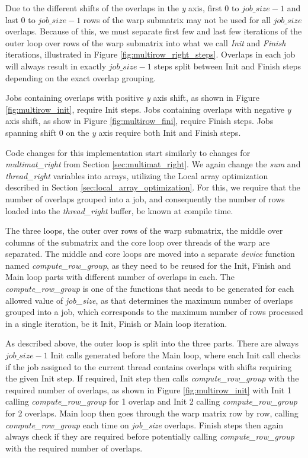 Due to the different shifts of the overlaps in the \textit{y} axis, first $0$ to $job\_size - 1$ and last $0$ to $job\_size - 1$ rows of the warp submatrix may not be used for all $job\_size$ overlaps. Because of this, we must separate first few and last few iterations of the outer loop over rows of the warp submatrix into what we call \textit{Init} and \textit{Finish} iterations, illustrated in Figure \ref{fig:multirow_right_steps}. Overlaps in each job will always result in exactly $job\_size - 1$ steps split between Init and Finish steps depending on the exact overlap grouping.

Jobs containing overlaps with positive \textit{y} axis shift, as shown in Figure \ref{fig:multirow_init}, require Init steps. Jobs containing overlaps with negative \textit{y} axis shift, as show in Figure \ref{fig:multirow_fini}, require Finish steps. Jobs spanning shift $0$ on the \textit{y} axis require both Init and Finish steps.


Code changes for this implementation start similarly to changes for \textit{multimat\_right} from Section \ref{sec:multimat_right}. We again change the \textit{sum} and \textit{thread\_right} variables into arrays, utilizing the Local array optimization described in Section \ref{sec:local_array_optimization}. For this, we require that the number of overlaps grouped into a job, and consequently the number of rows loaded into the \textit{thread\_right} buffer, be known at compile time.


The three loops, the outer over rows of the warp submatrix, the middle over columns of the submatrix and the core loop over threads of the warp are separated. The middle and core loops are moved into a separate \textit{device} function named \textit{compute\_row\_group}, as they need to be reused for the Init, Finish and Main loop parts with different number of overlaps in each. The \textit{compute\_row\_group} is one of the functions that needs to be generated for each allowed value of \textit{job\_size}, as that determines the maximum number of overlaps grouped into a job, which corresponds to the maximum number of rows processed in a single iteration, be it Init, Finish or Main loop iteration. 

As described above, the outer loop is split into the three parts. There are always $job\_size - 1$ Init calls generated before the Main loop, where each Init call checks if the job assigned to the current thread contains overlaps with shifts requiring the given Init step. If required, Init step then calls \textit{compute\_row\_group} with the required number of overlaps, as shown in Figure \ref{fig:multirow_init} with Init 1 calling \textit{compute\_row\_group} for 1 overlap and Init 2 calling \textit{compute\_row\_group} for 2 overlaps. Main loop then goes through the warp matrix row by row, calling \textit{compute\_row\_group} each time on \textit{job\_size} overlaps. Finish steps then again always check if they are required before potentially calling \textit{compute\_row\_group} with the required number of overlaps.




